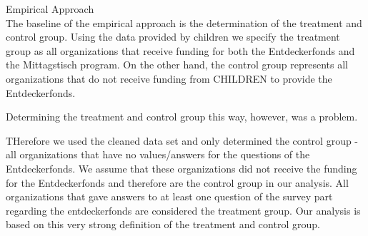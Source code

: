 \documentclass[12pt, a4paper, titlepage]{article}\usepackage[]{graphicx}\usepackage[]{color}
\begin{document}
\begin{table}
\begin{center}
\caption{Regression Results: dayToDaySkills}
\label{DayToDaySkillsRegressions}
\end{center}
\end{table}


Empirical Approach\\

The baseline of the empirical approach is the determination of the treatment and control group. Using the data provided by children we specify the treatment group as all organizations that receive funding for both the Entdeckerfonds and the Mittagstisch program. On the other hand, the control group represents all organizations that do not receive funding from CHILDREN to provide the Entdeckerfonds.

Determining the treatment and control group this way, however, was a problem.

THerefore we used the cleaned data set and only determined the control group - all organizations that have no values/answers for the questions of the Entdeckerfonds. We assume that these organizations did not receive the funding for the Entdeckerfonds and therefore are the control group in our analysis. All organizations that gave answers to at least one question of the survey part regarding the entdeckerfonds are considered the treatment group. 
Our analysis is based on this very strong definition of the treatment and control group.
\end{document}
